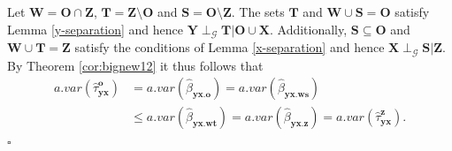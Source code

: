 \documentclass[11pt,a4paper]{article}
\theoremstyle{definition}
\theoremstyle{remark}
\newenvironment{proofof}[1][]{\begin{trivlist}
\item[\hskip \labelsep {\textit{Proof of #1.}}]}{\hfill{}$\square$\end{trivlist}}
\newcommand{\g}[1][G]{\mathcal{#1}}
\begin{document}
\begin{proofof}[Statement \ref{optimal} of Proposition~\ref{almost}]
	Let $\mathbf{W} = \mathbf{O} \cap \mathbf{Z}$, $\mathbf{T} = \mathbf{Z} \setminus \mathbf{O}$ and $\mathbf{S} = \mathbf{O} \setminus \mathbf{Z}$. 
	The sets $\mathbf{T}$ and $\mathbf{W} \cup \mathbf{S} = \mathbf{O}$ satisfy Lemma \ref{y-separation} and hence $\mathbf{Y} \perp_{\g} \mathbf{T}|\mathbf{O} \cup \mathbf{X}$. 
	Additionally, $\mathbf{S} \subseteq \mathbf{O}$ and $\mathbf{W} \cup \mathbf{T} = \mathbf{Z}$ satisfy the conditions of Lemma \ref{x-separation} and hence $\mathbf{X} \perp_{\g} \mathbf{S}|\mathbf{Z}$. By Theorem \ref{cor:bignew12} it thus follows that
	\[
	\begin{aligned} 
	a.var(\hat{\tau}^\mathbf{o}_{\mathbf{yx}})
	& 
	= a.var(\hat{\beta}_{\mathbf{yx}.\mathbf{o}}) 
	= a.var(\hat{\beta}_{\mathbf{yx}.\mathbf{ws}}) \\ 
	&
	\leq a.var(\hat{\beta}_{\mathbf{yx}.\mathbf{wt}})  = a.var(\hat{\beta}_{\mathbf{yx}.\mathbf{z}}) =
	a.var(\hat{\tau}^\mathbf{z}_{\mathbf{yx}}).
	\end{aligned}
	\]
\end{proofof}
\end{document}
